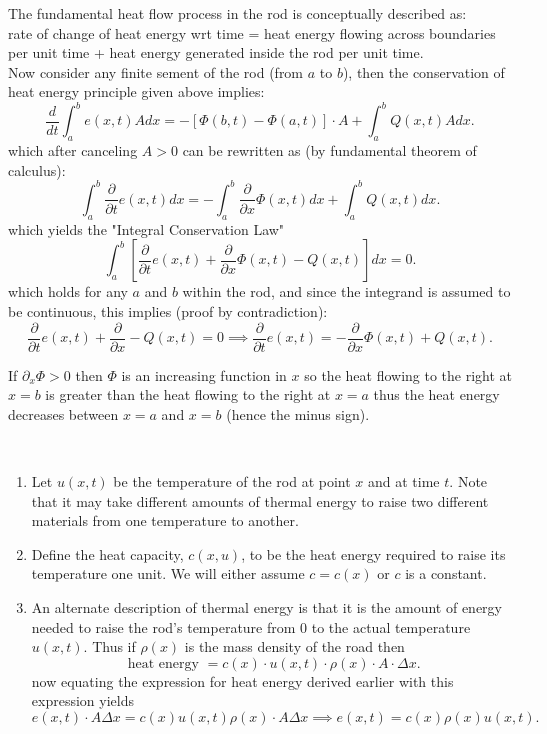 \documentclass[class=article,crop=false]{standalone}
\begin{document}
\begin{thm}
The fundamental heat flow process in the rod is conceptually described as:
\\

rate of change of heat energy wrt time = heat energy flowing across boundaries per unit time + heat energy generated inside the rod per unit time.
\\

Now consider any finite sement of the rod (from $a$ to $b$), then the conservation of heat energy principle given above implies:
\[
	\frac{d}{dt} \int_{ a}^{ b} e(x,t) A dx = -[\Phi(b,t)-\Phi(a,t)] \cdot A + \int_{ a}^{ b} Q(x,t) A dx  
.\] 
which after canceling $ A>0$ can be rewritten as (by fundamental theorem of calculus):
 \[
	 \int_{ a}^{ b} \frac{\partial}{\partial t} e(x,t) dx = -\int_{ a}^{ b} \frac{\partial }{\partial x} \Phi(x,t) dx + \int_{ a}^{ b} Q(x,t) dx     
.\] 
which yields the "Integral Conservation Law"
\[
	\int_{ a}^{ b} \left[ \frac{\partial }{\partial t} e(x,t) + \frac{\partial }{\partial x} \Phi(x,t) - Q(x,t) \right]  dx = 0
.\] 
which holds for any $ a$ and  $ b$ within the rod, and since the integrand is assumed to be continuous, this implies (proof by contradiction):
 \[
	 \frac{\partial }{\partial t} e(x,t) + \frac{\partial }{\partial x} -Q(x,t) = 0 \implies \frac{\partial }{\partial t} e(x,t) = -\frac{\partial }{\partial x} \Phi(x,t) + Q(x,t)
.\] 
\end{thm}

If $ \partial_x \Phi > 0 $ then $ \Phi$ is an increasing function in $ x$ so the heat flowing to the right at  $ x=b$ is greater than the heat flowing to the right at $ x=a$ thus the heat energy decreases between  $ x=a$ and  $ x=b$ (hence the minus sign).


~\begin{defn}
\begin{enumerate}[label=\arabic*)]
	\item Let $ u(x,t)$ be the temperature of the rod at point  $ x$ and at time  $ t$. Note that it may take different amounts of thermal energy to raise two different materials from one temperature to another.
	\item Define the heat capacity, $ c(x,u)$, to be the heat energy required to raise its temperature one unit. We will either assume  $ c=c(x)$ or  $ c$ is a constant.
	\item An alternate description of thermal energy is that it is the amount of energy needed to raise the rod's temperature from 0 to the actual temperature $ u(x,t)$. Thus if  $ \rho(x)$ is the mass density of the road then
\[
\text{ heat energy } = c(x) \cdot u(x,t) \cdot  \rho(x) \cdot A \cdot \Delta x 
.\] 
	now equating the expression for heat energy derived earlier with this expression yields
		\[
			e(x,t) \cdot  A \Delta x = c(x) u(x,t)\rho(x) \cdot  A \Delta x\implies e(x,t) = c(x) \rho(x) u(x,t)
		.\] 
\end{enumerate}
\end{defn}
\end{document}
